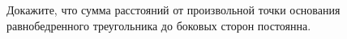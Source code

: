 \begin{ex}
	\begin{condition}
		Докажите, что сумма расстояний от произвольной точки основания равнобедренного треугольника до боковых сторон постоянна.
	\end{condition}
\end{ex}